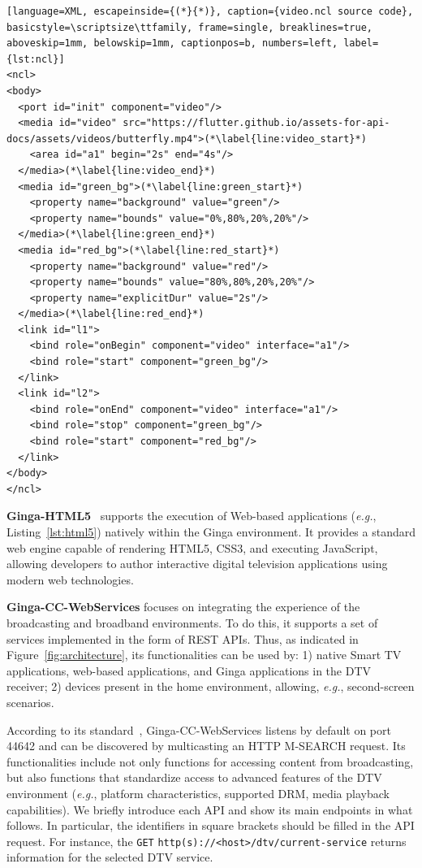 \documentclass[sigconf]{webmedia}
\begin{document}
\newpage


\begin{lstlisting}[language=XML, escapeinside={(*}{*)}, caption={video.ncl source code}, basicstyle=\scriptsize\ttfamily, frame=single, breaklines=true, aboveskip=1mm, belowskip=1mm, captionpos=b, numbers=left, label={lst:ncl}]
<ncl>
<body>
  <port id="init" component="video"/>
  <media id="video" src="https://flutter.github.io/assets-for-api-docs/assets/videos/butterfly.mp4">(*\label{line:video_start}*)
    <area id="a1" begin="2s" end="4s"/>
  </media>(*\label{line:video_end}*)
  <media id="green_bg">(*\label{line:green_start}*)
    <property name="background" value="green"/>
    <property name="bounds" value="0%,80%,20%,20%"/>
  </media>(*\label{line:green_end}*)
  <media id="red_bg">(*\label{line:red_start}*)
    <property name="background" value="red"/>
    <property name="bounds" value="80%,80%,20%,20%"/>
    <property name="explicitDur" value="2s"/>
  </media>(*\label{line:red_end}*)
  <link id="l1">
    <bind role="onBegin" component="video" interface="a1"/>
    <bind role="start" component="green_bg"/>
  </link>
  <link id="l2">
    <bind role="onEnd" component="video" interface="a1"/>
    <bind role="stop" component="green_bg"/>
    <bind role="start" component="red_bg"/>
  </link>
</body>
</ncl>
\end{lstlisting}

\textbf{Ginga-HTML5}~\cite{abnt_15606_10_2026} supports the execution of Web-based applications (\textit{e.g.}, Listing~\ref{lst:html5}) natively within the Ginga environment. It provides a standard web engine capable of rendering HTML5, CSS3, and executing JavaScript, allowing developers to author interactive digital television applications using modern web technologies. 

\textbf{Ginga-CC-WebServices} focuses on integrating the experience of the broadcasting and broadband environments.
To do this, it supports a set of services implemented in the form of REST APIs.
Thus, as indicated in Figure~\ref{fig:architecture}, its functionalities can be used by:
1) native Smart TV applications, web-based applications, and Ginga applications in the DTV receiver;
2) devices present in the home environment, allowing, \textit{e.g.}, second-screen scenarios. 

According to its standard~\cite{abnt_15606_11}, Ginga-CC-WebServices listens by default on port 44642 and can be discovered by multicasting an HTTP M-SEARCH request.
Its functionalities include not only functions for accessing content from broadcasting, but also functions that standardize access to advanced features of the DTV environment (\textit{e.g.},  platform characteristics, supported DRM, media playback capabilities). 
We briefly introduce each API and show its main endpoints in what follows.
In particular, the identifiers in square brackets should be filled in the API request. For instance, the \texttt{GET} \texttt{http(s)://\textless{}host\textgreater{}/dtv/current-service} returns information for the selected DTV service.
\end{document}
